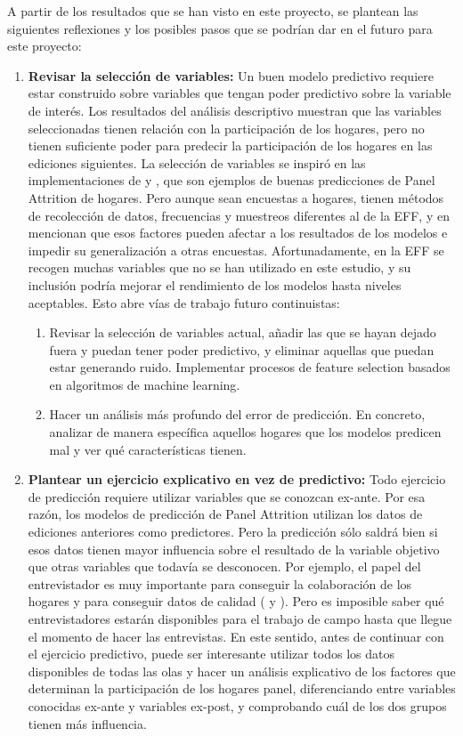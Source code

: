 A partir de los resultados que se han visto en este proyecto, se plantean las siguientes reflexiones y los posibles pasos que se podrían dar en el futuro para este proyecto:

\begin{enumerate}
    \item \textbf{Revisar la selección de variables:} Un buen modelo predictivo requiere estar construido sobre variables que tengan poder predictivo sobre la variable de interés. Los resultados del análisis descriptivo muestran que las variables seleccionadas tienen relación con la participación de los hogares, pero no tienen suficiente poder para predecir la participación de los hogares en las ediciones siguientes. La selección de variables se inspiró en las implementaciones de \cite{kern2021predicting} y \cite{beste2023case}, que son ejemplos de buenas predicciones de Panel Attrition de hogares. Pero aunque sean encuestas a hogares, tienen métodos de recolección de datos, frecuencias y muestreos diferentes al de la EFF, y en \cite{jankowsky2022validation} mencionan que esos factores pueden afectar a los resultados de los modelos e impedir su generalización a otras encuestas. Afortunadamente, en la EFF se recogen muchas variables que no se han utilizado en este estudio, y su inclusión podría mejorar el rendimiento de los modelos hasta niveles aceptables. Esto abre vías de trabajo futuro continuistas:
    \begin{enumerate}[noitemsep]
        \item Revisar la selección de variables actual, añadir las que se hayan dejado fuera y puedan tener poder predictivo, y eliminar aquellas que puedan estar generando ruido. Implementar procesos de feature selection basados en algoritmos de machine learning.
        \item Hacer un análisis más profundo del error de predicción. En concreto, analizar de manera específica aquellos hogares que los modelos predicen mal y ver qué características tienen.
    \end{enumerate}
    \item \textbf{Plantear un ejercicio explicativo en vez de predictivo:} Todo ejercicio de predicción requiere utilizar variables que se conozcan ex-ante. Por esa razón, los modelos de predicción de Panel Attrition utilizan los datos de ediciones anteriores como predictores. Pero la predicción sólo saldrá bien si esos datos tienen mayor influencia sobre el resultado de la variable objetivo que otras variables que todavía se desconocen. Por ejemplo, el papel del entrevistador es muy importante para conseguir la colaboración de los hogares y para conseguir datos de calidad (\cite{lynn2018tackling} y \cite{groves2006nonresponse}). Pero es imposible saber qué entrevistadores estarán disponibles para el trabajo de campo hasta que llegue el momento de hacer las entrevistas. En este sentido, antes de continuar con el ejercicio predictivo, puede ser interesante utilizar todos los datos disponibles de todas las olas y hacer un análisis explicativo de los factores que determinan la participación de los hogares panel, diferenciando entre variables conocidas ex-ante y variables ex-post, y comprobando cuál de los dos grupos tienen más influencia.

\end{enumerate}
